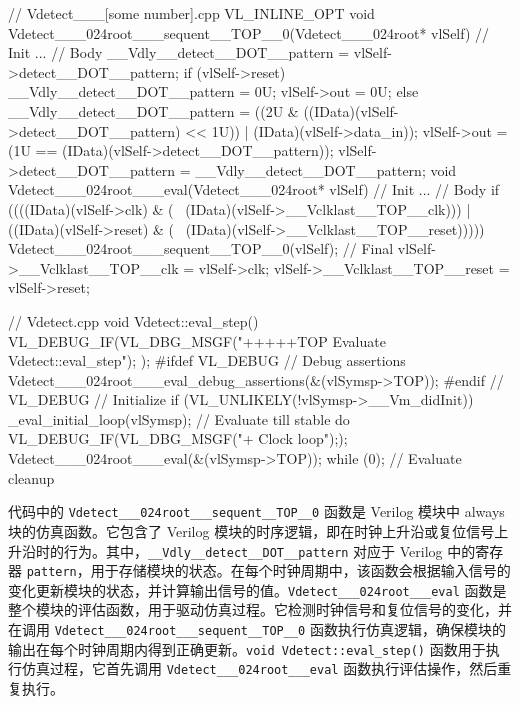 \begin{CodeBlock}[language=BookCpp]
// Vdetect___[some number].cpp
VL_INLINE_OPT void Vdetect___024root___sequent__TOP__0(Vdetect___024root* vlSelf) {
	// Init ...
    // Body
    __Vdly__detect__DOT__pattern = vlSelf->detect__DOT__pattern;
    if (vlSelf->reset) {
        __Vdly__detect__DOT__pattern = 0U;
        vlSelf->out = 0U;
    } else {
        __Vdly__detect__DOT__pattern = ((2U & ((IData)(vlSelf->detect__DOT__pattern) 
                                               << 1U)) 
                                        | (IData)(vlSelf->data_in));
        vlSelf->out = (1U == (IData)(vlSelf->detect__DOT__pattern));
    }
    vlSelf->detect__DOT__pattern = __Vdly__detect__DOT__pattern;
}
void Vdetect___024root___eval(Vdetect___024root* vlSelf) {
	// Init ...
	// Body
    if ((((IData)(vlSelf->clk) & (~ (IData)(vlSelf->__Vclklast__TOP__clk))) 
         | ((IData)(vlSelf->reset) & (~ (IData)(vlSelf->__Vclklast__TOP__reset))))) {
        Vdetect___024root___sequent__TOP__0(vlSelf);
    }
    // Final
    vlSelf->__Vclklast__TOP__clk = vlSelf->clk;
    vlSelf->__Vclklast__TOP__reset = vlSelf->reset;
}

// Vdetect.cpp
void Vdetect::eval_step() {
    VL_DEBUG_IF(VL_DBG_MSGF("+++++TOP Evaluate Vdetect::eval_step\n"); );
#ifdef VL_DEBUG
    // Debug assertions
    Vdetect___024root___eval_debug_assertions(&(vlSymsp->TOP));
#endif  // VL_DEBUG
    // Initialize
    if (VL_UNLIKELY(!vlSymsp->__Vm_didInit)) _eval_initial_loop(vlSymsp);
    // Evaluate till stable
    do {
        VL_DEBUG_IF(VL_DBG_MSGF("+ Clock loop\n"););
        Vdetect___024root___eval(&(vlSymsp->TOP));
    } while (0);
    // Evaluate cleanup
}

\end{CodeBlock}

代码中的 \texttt{Vdetect\_\_\_024root\_\_\_sequent\_\_TOP\_\_0} 函数是 Verilog 模块中 always 块的仿真函数。它包含了 Verilog 模块的时序逻辑，即在时钟上升沿或复位信号上升沿时的行为。其中，\texttt{\_\_Vdly\_\_detect\_\_DOT\_\_pattern} 对应于 Verilog 中的寄存器 \texttt{pattern}，用于存储模块的状态。在每个时钟周期中，该函数会根据输入信号的变化更新模块的状态，并计算输出信号的值。\texttt{Vdetect\_\_\_024root\_\_\_eval} 函数是整个模块的评估函数，用于驱动仿真过程。它检测时钟信号和复位信号的变化，并在调用 \texttt{Vdetect\_\_\_024root\_\_\_sequent\_\_TOP\_\_0} 函数执行仿真逻辑，确保模块的输出在每个时钟周期内得到正确更新。\texttt{void\ Vdetect::eval\_step()} 函数用于执行仿真过程，它首先调用 \texttt{Vdetect\_\_\_024root\_\_\_eval} 函数执行评估操作，然后重复执行。

